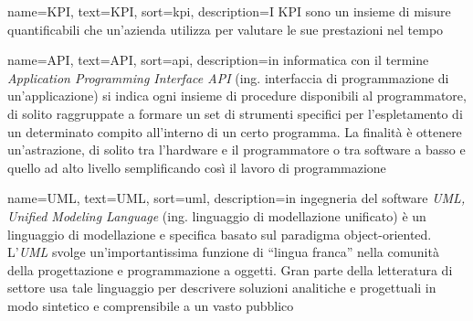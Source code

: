 
%




{
    name={KPI},
    text=KPI,
    sort=kpi,
    description={I KPI sono un insieme di misure quantificabili che un’azienda utilizza per valutare le sue prestazioni nel tempo}
}


{
    name={API},
    text=API,
    sort=api,
    description={in informatica con il termine \emph{Application Programming Interface API} (ing. interfaccia di programmazione di un'applicazione) si indica ogni insieme di procedure disponibili al programmatore, di solito raggruppate a formare un set di strumenti specifici per l'espletamento di un determinato compito all'interno di un certo programma. La finalità è ottenere un'astrazione, di solito tra l'hardware e il programmatore o tra software a basso e quello ad alto livello semplificando così il lavoro di programmazione}
}

{
    name={UML},
    text=UML,
    sort=uml,
    description={in ingegneria del software \emph{UML, Unified Modeling Language} (ing. linguaggio di modellazione unificato) è un linguaggio di modellazione e specifica basato sul paradigma object-oriented. L'\emph{UML} svolge un'importantissima funzione di ``lingua franca'' nella comunità della progettazione e programmazione a oggetti. Gran parte della letteratura di settore usa tale linguaggio per descrivere soluzioni analitiche e progettuali in modo sintetico e comprensibile a un vasto pubblico}
}
